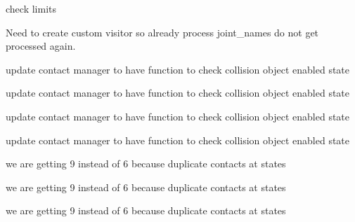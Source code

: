 \begin{DoxyRefList}
%
check limits  
\item[Member \mbox{\hyperlink{classtesseract__scene__graph_1_1SceneGraph_a3d78ee8fc4abe4542a4d4f5195a972c5}{tesseract\+\_\+scene\+\_\+graph\+::Scene\+Graph\+::get\+Joint\+Children\+Names}} (const std\+::vector$<$ std\+::string $>$ \&names) const]\label{todo__todo000016}%
%
Need to create custom visitor so already process joint\+\_\+names do not get processed again.  
\item[Member \mbox{\hyperlink{tesseract__environment__unit_8cpp_a0885de2a8da955b4bb9b9be73de49350}{TEST}} (Tesseract\+Environment\+Unit, Env\+Change\+Link\+Collision\+Enabled\+Command\+Unit)]\label{todo__todo000005}%
%
update contact manager to have function to check collision object enabled state  
\item[Member \mbox{\hyperlink{tesseract__environment__unit_8cpp_aa8be7c5729a18846a93f15be668f8d93}{TEST}} (Tesseract\+Environment\+Unit, Env\+Change\+Link\+Visibility\+Command\+Unit)]\label{todo__todo000006}%
%
update contact manager to have function to check collision object enabled state  
\item[Member \mbox{\hyperlink{tesseract__environment__unit_8cpp_a48e8ba4aff90b6492e3905dc3d9a2686}{TEST}} (Tesseract\+Environment\+Unit, Env\+Set\+Active\+Continuous\+Contact\+Manager\+Command\+Unit)]\label{todo__todo000007}%
%
update contact manager to have function to check collision object enabled state  
\item[Member \mbox{\hyperlink{tesseract__environment__unit_8cpp_ac000b39be53683eced961b8e905d5050}{TEST}} (Tesseract\+Environment\+Unit, Env\+Set\+Active\+Discrete\+Contact\+Manager\+Command\+Unit)]\label{todo__todo000008}%
%
update contact manager to have function to check collision object enabled state  
\item[Member \mbox{\hyperlink{tesseract__environment__unit_8cpp_a0d0135e86e53fd517ae04252a6fd398c}{TEST}} (Tesseract\+Environment\+Unit, check\+Trajectory\+Unit)]\label{todo__todo000009}%
%
we are getting 9 instead of 6 because duplicate contacts at states 

\label{todo__todo000010}%
%
we are getting 9 instead of 6 because duplicate contacts at states 

\label{todo__todo000011}%
%
we are getting 9 instead of 6 because duplicate contacts at states 


\end{DoxyRefList}
